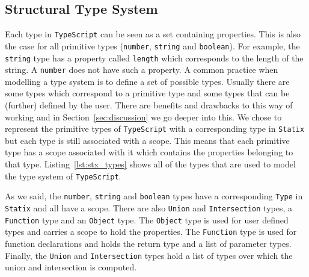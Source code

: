 \documentclass{article}
\newcommand{\ttt}[1]{\texttt{#1}}
\begin{document}
\subsection{Structural Type System}
Each type in \ttt{TypeScript} can be seen as a set containing properties.
This is also the case for all primitive types (\ttt{number}, \ttt{string} and \ttt{boolean}).
For example, the \ttt{string} type has a property called \ttt{length} which corresponds to the length of the string.
A \ttt{number} does not have such a property.
A common practice when modelling a type system is to define a set of possible types.
Usually there are some types which correspond to a primitive type and some types that can be (further) defined by the user.
There are benefits and drawbacks to this way of working and in Section~\ref{sec:discussion} we go deeper into this.
We chose to represent the primitive types of \ttt{TypeScript} with a corresponding type in \ttt{Statix} but each type is still associated with a scope.
This means that each primitive type has a scope associated with it which contains the properties belonging to that type.
Listing~\ref{lst:stx_types} shows all of the types that are used to model the type system of \ttt{TypeScript}.

\noindent
\begin{center}
    \begin{minipage}{.60\textwidth}
    
    \end{minipage}
\end{center}

As we said, the \ttt{number}, \ttt{string} and \ttt{boolean} types have a corresponding \ttt{Type} in \ttt{Statix} and all have a scope.
There are also \ttt{Union} and \ttt{Intersection} types, a \ttt{Function} type and an \ttt{Object} type.
The \ttt{Object} type is used for user defined types and carries a scope to hold the properties.
The \ttt{Function} type is used for function declarations and holds the return type and a list of parameter types.
Finally, the \ttt{Union} and \ttt{Intersection} types hold a list of types over which the union and intersection is computed.
\end{document}
